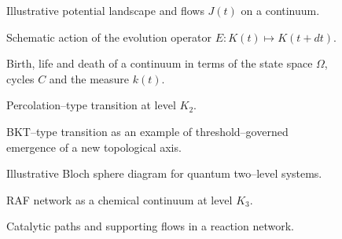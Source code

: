 \begin{figure}[p]
  \centering
  
  \caption{Illustrative potential landscape and flows \(J(t)\) on a continuum.}
  \label{fig:potential-landscape}
\end{figure}

\begin{figure}[p]
  \centering
  
  \caption{Schematic action of the evolution operator
           \(E : K(t) \mapsto K(t+dt)\).}
  \label{fig:evolution-operator}
\end{figure}

\begin{figure}[p]
  \centering
  
  \caption{Birth, life and death of a continuum in terms of the state space
           \texorpdfstring{\(\Omega\)}{\Omega}, cycles \texorpdfstring{\(C\)}{C} and the measure \(k(t)\).}
  \label{fig:birth-life-death}
\end{figure}

\begin{figure}[p]
  \centering
  
  \caption{Percolation--type transition at level \texorpdfstring{\(K_2\)}{K_2}.}
  \label{fig:percolation}
\end{figure}

\begin{figure}[p]
  \centering
  
  \caption{BKT--type transition as an example of threshold--governed emergence
           of a new topological axis.}
  \label{fig:bkt-transition}
\end{figure}

\begin{figure}[p]
  \centering
  
  \caption{Illustrative Bloch sphere diagram for quantum two--level systems.}
  \label{fig:bloch-sphere}
\end{figure}

\begin{figure}[p]
  \centering
  
  \caption{RAF network as a chemical continuum at level \texorpdfstring{\(K_3\)}{K_3}.}
  \label{fig:raf-network}
\end{figure}

\begin{figure}[p]
  \centering
  
  \caption{Catalytic paths and supporting flows in a reaction network.}
  \label{fig:catalytic-paths}
\end{figure}

